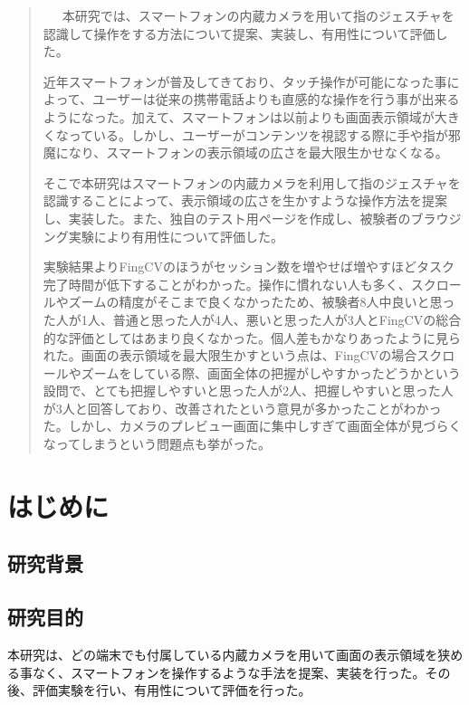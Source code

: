 \documentclass[11pt,a4j, titlepage]{jarticle} %
\begin{document}
\begin{abstract}
	\ \ \ 本研究では、スマートフォンの内蔵カメラを用いて指のジェスチャを認識して操作をする方法について提案、実装し、有用性について評価した。

	近年スマートフォンが普及してきており、タッチ操作が可能になった事によって、ユーザーは従来の携帯電話よりも直感的な操作を行う事が出来るようになった。加えて、スマートフォンは以前よりも画面表示領域が大きくなっている。しかし、ユーザーがコンテンツを視認する際に手や指が邪魔になり、スマートフォンの表示領域の広さを最大限生かせなくなる。

	そこで本研究はスマートフォンの内蔵カメラを利用して指のジェスチャを認識することによって、表示領域の広さを生かすような操作方法を提案し、実装した。また、独自のテスト用ページを作成し、被験者のブラウジング実験により有用性について評価した。

	実験結果よりFingCVのほうがセッション数を増やせば増やすほどタスク完了時間が低下することがわかった。操作に慣れない人も多く、スクロールやズームの精度がそこまで良くなかったため、被験者8人中良いと思った人が1人、普通と思った人が4人、悪いと思った人が3人とFingCVの総合的な評価としてはあまり良くなかった。個人差もかなりあったように見られた。画面の表示領域を最大限生かすという点は、FingCVの場合スクロールやズームをしている際、画面全体の把握がしやすかったどうかという設問で、とても把握しやすいと思った人が2人、把握しやすいと思った人が3人と回答しており、改善されたという意見が多かったことがわかった。しかし、カメラのプレビュー画面に集中しすぎて画面全体が見づらくなってしまうという問題点も挙がった。

\end{abstract}

\tableofcontents
\newpage
\listoffigures
\newpage
\listoftables
\newpage
\section{はじめに}
\subsection{研究背景}


\subsection{研究目的}
本研究は、どの端末でも付属している内蔵カメラを用いて画面の表示領域を狭める事なく、スマートフォンを操作するような手法を提案、実装を行った。その後、評価実験を行い、有用性について評価を行った。
\end{document}
